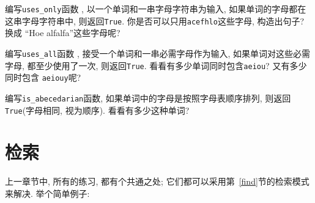 \documentclass[10pt]{book}
\begin{document}
\begin{exercise}
编写\verb"uses_only"函数 , 以一个单词和一串字母字符串为输入, 
如果单词的字母都在这串字母字符串中, 则返回{\tt True}.
你是否可以只用{\tt acefhlo}这些字母, 构造出句子?
换成 ``Hoe alfalfa''这些字母呢?

\end{exercise}


\begin{exercise} 
编写\verb"uses_all"函数 , 接受一个单词和一串必需字母作为输入, 
如果单词对这些必需字母, 都至少使用了一次, 则返回{\tt True}. 
看看有多少单词同时包含{\tt aeiou}? 又有多少同时包含 {\tt aeiouy}呢?

\end{exercise}


\begin{exercise}
编写\verb"is_abecedarian"函数, 如果单词中的字母是按照字母表顺序排列, 
则返回 {\tt True}(字母相同, 视为顺序). 看看有多少这种单词?


\end{exercise}

\section{检索}
\label{search}

上一章节中, 所有的练习, 都有个共通之处;
它们都可以采用第~\ref{find}节的检索模式来解决. 
举个简单例子:
\end{document}
